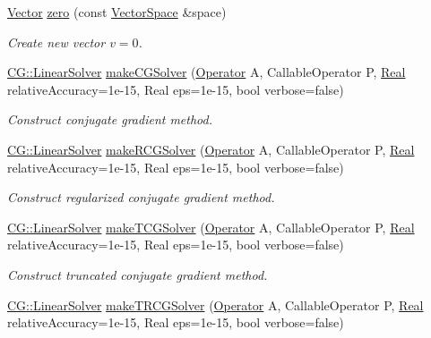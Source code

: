 \begin{DoxyCompactItemize}
\item 
\hypertarget{namespaceSpacy_ac7f0661bfdb52144b9ff0b9bbdd81f69}{\hyperlink{classSpacy_1_1Vector}{\-Vector} \hyperlink{namespaceSpacy_ac7f0661bfdb52144b9ff0b9bbdd81f69}{zero} (const \hyperlink{classSpacy_1_1VectorSpace}{\-Vector\-Space} \&space)}\label{namespaceSpacy_ac7f0661bfdb52144b9ff0b9bbdd81f69}

\begin{DoxyCompactList}\small\item\em \-Create new vector $v=0$. \end{DoxyCompactList}\item 
\hyperlink{classSpacy_1_1CG_1_1LinearSolver}{\-C\-G\-::\-Linear\-Solver} \hyperlink{namespaceSpacy_a158f06b6790d44613c6533fbd3822e6a}{make\-C\-G\-Solver} (\hyperlink{classSpacy_1_1Operator}{\-Operator} \-A, \-Callable\-Operator \-P, \hyperlink{classSpacy_1_1Real}{\-Real} relative\-Accuracy=1e-\/15, Real eps=1e-\/15, bool verbose=false)
\begin{DoxyCompactList}\small\item\em \-Construct conjugate gradient method. \end{DoxyCompactList}\item 
\hyperlink{classSpacy_1_1CG_1_1LinearSolver}{\-C\-G\-::\-Linear\-Solver} \hyperlink{namespaceSpacy_af70adbdd6fafbe87bd7c79be078851d6}{make\-R\-C\-G\-Solver} (\hyperlink{classSpacy_1_1Operator}{\-Operator} \-A, \-Callable\-Operator \-P, \hyperlink{classSpacy_1_1Real}{\-Real} relative\-Accuracy=1e-\/15, Real eps=1e-\/15, bool verbose=false)
\begin{DoxyCompactList}\small\item\em \-Construct regularized conjugate gradient method. \end{DoxyCompactList}\item 
\hyperlink{classSpacy_1_1CG_1_1LinearSolver}{\-C\-G\-::\-Linear\-Solver} \hyperlink{namespaceSpacy_a8c2664d93c0a0049cd3849a3a0c973a8}{make\-T\-C\-G\-Solver} (\hyperlink{classSpacy_1_1Operator}{\-Operator} \-A, \-Callable\-Operator \-P, \hyperlink{classSpacy_1_1Real}{\-Real} relative\-Accuracy=1e-\/15, Real eps=1e-\/15, bool verbose=false)
\begin{DoxyCompactList}\small\item\em \-Construct truncated conjugate gradient method. \end{DoxyCompactList}\item 
\hyperlink{classSpacy_1_1CG_1_1LinearSolver}{\-C\-G\-::\-Linear\-Solver} \hyperlink{namespaceSpacy_af214c1f5a7c2e48d16370a7a386ca8df}{make\-T\-R\-C\-G\-Solver} (\hyperlink{classSpacy_1_1Operator}{\-Operator} \-A, \-Callable\-Operator \-P, \hyperlink{classSpacy_1_1Real}{\-Real} relative\-Accuracy=1e-\/15, Real eps=1e-\/15, bool verbose=false)

\end{DoxyCompactItemize}
